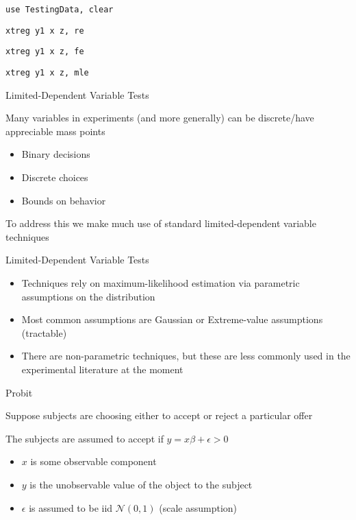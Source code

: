 \documentclass{beamer}
\begin{document}
\begin{frame}
    \begin{card}[STATA]
        \texttt{use TestingData, clear}
        
        \texttt{xtreg y1 x z, re}
        
        \texttt{xtreg y1 x z, fe}
        
        \texttt{xtreg y1 x z, mle}
    \end{card}
\end{frame}


\begin{frame}{Limited-Dependent Variable Tests}
	\begin{card}
Many variables in experiments (and more generally) can be discrete/have appreciable mass points
		\begin{itemize}
			\item Binary decisions
			\item Discrete choices
			\item Bounds on behavior
		\end{itemize}
	\end{card}\pause
	\begin{card} 
	To address this we make much use of standard limited-dependent variable techniques
	\end{card}
\end{frame}

\begin{frame}{Limited-Dependent Variable Tests}
    \begin{card}
	\begin{itemize}
		\item Techniques rely on maximum-likelihood estimation via parametric assumptions on the distribution
		\item Most common assumptions are Gaussian or Extreme-value assumptions (tractable)
		\item There are non-parametric techniques, but these are less commonly used in the experimental literature at the moment
	\end{itemize}
	\end{card}
\end{frame}

\begin{frame}{Probit}
	\begin{card}
Suppose subjects are choosing either to accept or reject a particular offer

The subjects are assumed to accept if $y=x\beta +\epsilon>0$
		\begin{itemize}
			\item $x$ is some observable component
			\item $y$ is the unobservable value of the object to the subject
			\item $\epsilon$ is assumed to be iid $\mathcal{N}(0,1)$ (scale assumption)
		\end{itemize}
\end{card}	
		
\end{frame}
\end{document}
